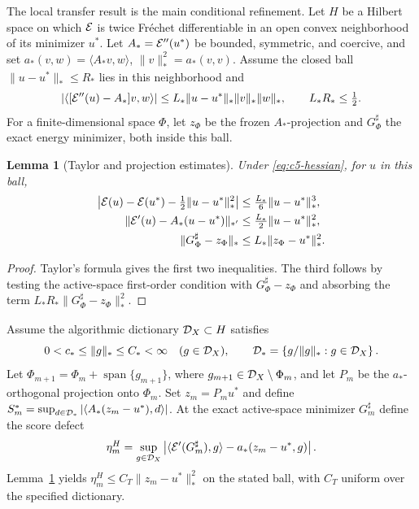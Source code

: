 \documentclass[11pt]{article}
\newtheorem{lemma}[theorem]{Lemma}
\theoremstyle{remark}\newtheorem{remark}[theorem]{Remark}
\begin{document}
The local transfer result is the main conditional refinement. Let $H$ be a
Hilbert space on which $\mathcal E$ is twice Fr\'echet differentiable in an open
convex neighborhood of its minimizer $u^*$. Let $A_*=\mathcal E''(u^*)$ be bounded,
symmetric, and coercive, and set
$a_*(v,w)=\langle A_*v,w\rangle$, $\|v\|_*^2=a_*(v,v)$.
Assume the closed ball $\|u-u^*\|_*\le R_*$ lies in this neighborhood and
\begin{equation}
 |\langle[\mathcal E''(u)-A_*]v,w\rangle|
 \le L_*\|u-u^*\|_*\|v\|_*\|w\|_*,\qquad L_*R_*\le\tfrac12 .
 \label{eq:c5-hessian}
\end{equation}
For a finite-dimensional space $\Phi$, let $z_\Phi$ be the frozen $A_*$-projection and
$G_\Phi^\sharp$ the exact energy minimizer, both inside this ball.

\begin{lemma}[Taylor and projection estimates]
\label{lem:c5-projection}
Under \eqref{eq:c5-hessian}, for $u$ in this ball,
\begin{align}
 \left|\mathcal E(u)-\mathcal E(u^*)-\tfrac12\|u-u^*\|_*^2\right|&\le\tfrac{L_*}{6}\|u-u^*\|_*^3,\\
 \|\mathcal E'(u)-A_*(u-u^*)\|_{*'}&\le\tfrac{L_*}{2}\|u-u^*\|_*^2,\\
 \|G_\Phi^\sharp-z_\Phi\|_*&\le L_*\|z_\Phi-u^*\|_*^2.
 \label{eq:c5-proj}
\end{align}
\end{lemma}
\begin{proof}
Taylor's formula gives the first two inequalities.  The third follows by testing the active-space first-order condition with $G_\Phi^\sharp-z_\Phi$ and absorbing the term $L_*R_*\|G_\Phi^\sharp-z_\Phi\|_*^2$.
\end{proof}

Assume the algorithmic dictionary $\mathcal D_X\subset H$ satisfies
\begin{equation}
 0<c_*\le\|g\|_*\le C_*<\infty\quad(g\in\mathcal D_X),
\qquad \mathcal D_* = \left\{g/\|g\|_*:g\in\mathcal D_X\right\}.
 \label{eq:c5-bridge}
\end{equation}
Let $\Phi_{m+1}=\Phi_m+\operatorname{span}\{g_{m+1}\}$, where
$g_{m+1}\in\mathcal D_X\setminus\Phi_m$, and let $P_m$ be the $a_*$-orthogonal
projection onto $\Phi_m$. Set $z_m=P_mu^*$ and define
$S_m^*=\sup_{d\in\mathcal D_*}|\langle A_*(z_m-u^*),d\rangle|$.  At the exact
active-space minimizer $G_m^\sharp$ define the score defect
\[
 \eta_m^H=\sup_{g\in\mathcal D_X}
 \left|\langle\mathcal E'(G_m^\sharp),g\rangle-a_*(z_m-u^*,g)\right|.
\]
Lemma~\ref{lem:c5-projection} yields
$\eta_m^H\le C_{T}\|z_m-u^*\|_*^2$ on the stated ball, with $C_T$ uniform
over the specified dictionary.
\end{document}
